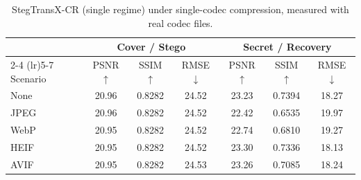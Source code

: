 \begin{table}[t]
\centering
\caption{StegTransX-CR (single regime) under single-codec compression, measured with real codec files.}
\label{tab:single-single-real}
\begin{tabular}{lcccccc}
\toprule
& \multicolumn{3}{c}{Cover / Stego} & \multicolumn{3}{c}{Secret / Recovery} \\
\cmidrule(lr){2-4} \cmidrule(lr){5-7}
Scenario & PSNR $\uparrow$ & SSIM $\uparrow$ & RMSE $\downarrow$ & PSNR $\uparrow$ & SSIM $\uparrow$ & RMSE $\downarrow$ \\
\midrule
None & 20.96 & 0.8282 & 24.52 & 23.23 & 0.7394 & 18.27 \\
JPEG & 20.96 & 0.8282 & 24.52 & 22.42 & 0.6535 & 19.97 \\
WebP & 20.95 & 0.8282 & 24.52 & 22.74 & 0.6810 & 19.27 \\
HEIF & 20.95 & 0.8282 & 24.52 & 23.30 & 0.7336 & 18.13 \\
AVIF & 20.95 & 0.8282 & 24.53 & 23.26 & 0.7085 & 18.24 \\
\bottomrule
\end{tabular}
\end{table}
